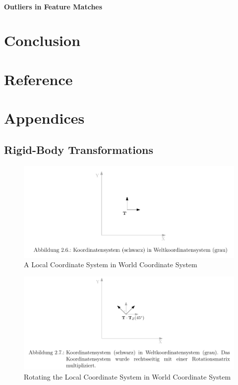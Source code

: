 \documentclass[a4paper]{report}
\numberwithin{figure}{section}
\begin{document}
\subsubsection{Outliers in Feature Matches} \label{sb_sb_sc_outliers}


\chapter{Conclusion} \label{cp_conc}

\chapter{Reference} \label{cp_ref}


\chapter{Appendices} \label{cp_appendices}

\section{Rigid-Body Transformations} \label{sc_rigid_body_transformations}

\begin{figure}[H]
	\centering
	\includegraphics[width=\linewidth,natwidth=640,natheight=640]
	{fig/ref_imgs/2d_local_coords_in_world_coords.png}
  \caption{A Local Coordinate System in World Coordinate System}
	\label{fig:2d_local_coords_in_world_coords}
\end{figure}

\begin{figure}[H]
	\centering
	\includegraphics[width=\linewidth,natwidth=640,natheight=640]
	{fig/ref_imgs/2d_rotation.png}
  \caption{Rotating the Local Coordinate System in World Coordinate System}
	\label{fig:2d_rotation}
\end{figure}
\end{document}
